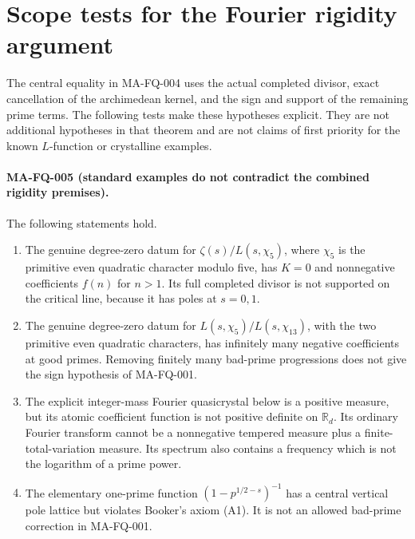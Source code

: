 \section{Scope tests for the Fourier rigidity argument}
\label{sec:s5-scope-tests}

The central equality in MA-FQ-004 uses the actual completed divisor,
exact cancellation of the archimedean kernel, and the sign and
support of the remaining prime terms.  The following tests make
these hypotheses explicit.  They are not additional hypotheses in
that theorem and are not claims of first priority for the known
$L$-function or crystalline examples.

\paragraph{MA-FQ-005 (standard examples do not contradict the combined rigidity premises).}
The following statements hold.
\begin{enumerate}
\item The genuine degree-zero datum for $\zeta(s)/L(s,\chi_5)$,
where $\chi_5$ is the primitive even quadratic character modulo
five, has $K=0$ and nonnegative coefficients $f(n)$ for $n>1$.
Its full completed divisor is not supported on the critical line,
because it has poles at $s=0,1$.
\item The genuine degree-zero datum for
$L(s,\chi_5)/L(s,\chi_{13})$, with the two primitive even
quadratic characters, has infinitely many negative coefficients
at good primes.  Removing finitely many bad-prime progressions
does not give the sign hypothesis of MA-FQ-001.
\item The explicit integer-mass Fourier quasicrystal below is a
positive measure, but its atomic coefficient function is not
positive definite on $\mathbb R_d$.  Its ordinary Fourier
transform cannot be a nonnegative tempered measure plus a
finite-total-variation measure.  Its spectrum also contains a
frequency which is not the logarithm of a prime power.
\item The elementary one-prime function
$(1-p^{1/2-s})^{-1}$ has a central vertical pole lattice but
violates Booker's axiom (A1).  It is not an allowed bad-prime
correction in MA-FQ-001.
\end{enumerate}

